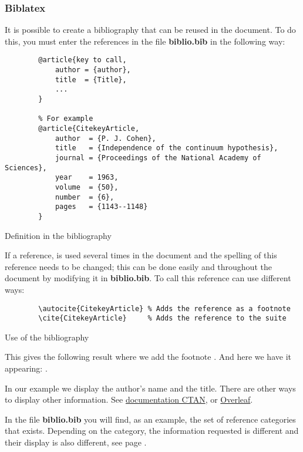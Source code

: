 \subsubsection{Biblatex}
It is possible to create a bibliography that can be reused in the document.
To do this, you must enter the references in the file \textbf{biblio.bib} in the following way:
\begin{code}
    \begin{verbatim}
        @article{key to call,
            author = {author},
            title  = {Title},
            ...
        }

        % For example
        @article{CitekeyArticle,
            author  = {P. J. Cohen},
            title   = {Independence of the continuum hypothesis},
            journal = {Proceedings of the National Academy of Sciences},
            year    = 1963,
            volume  = {50},
            number  = {6},
            pages   = {1143--1148}
        }
\end{verbatim}
    \caption{Definition in the bibliography}
\end{code}

If a reference, is used several times in the document and the spelling of this reference
needs to be changed; this can be done easily and throughout the document by modifying it in
\textbf{biblio.bib}.
To call this reference can use different ways:
\begin{code}
    \begin{verbatim}
        \autocite{CitekeyArticle} % Adds the reference as a footnote
        \cite{CitekeyArticle}     % Adds the reference to the suite
\end{verbatim}
    \caption{Use of the bibliography}
\end{code}

This gives the following result where we add the footnote \autocite{CitekeyArticle}.
And here we have it appearing: \cite{CitekeyArticle}. \newline

In our example we display the author's name and the title. There are other ways to display other information.
See \href{https://mirror.ibcp.fr/pub/CTAN/macros/latex/contrib/biblatex/doc/biblatex.pdf#subsection.3.9}{documentation CTAN}, or \href{https://fr.overleaf.com/learn/latex/Bibliography_management_with_bibtex}{Overleaf}. \newline

In the file \textbf{biblio.bib} you will find, as an example, the set of reference categories that exists.
Depending on the category, the information requested is different and their display is also different,
see page \pageref{bibliography}.

